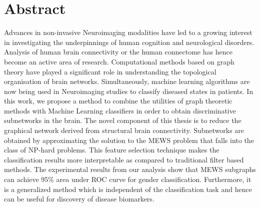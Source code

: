 \documentclass[msthesis.tex]{subfiles}
\begin{document}
\chapter{Abstract}
\thispagestyle{empty}

Advances in non-invasive Neuroimaging modalities have led to a growing interest in investigating the underpinnings of human cognition and neurological disorders. Analysis of human brain connectivity or the human connectome has hence become an active area of research. Computational methods based on graph theory have played a significant role in understanding the topological organisation of brain networks. Simultaneously, machine learning algorithms are now being used in Neuroimaging studies to classify diseased states in patients. In this work, we propose a method to combine the utilities of graph theoretic methods with Machine Learning classifiers in order to obtain discriminative subnetworks in the brain. The novel component of this thesis is to reduce the graphical network derived from structural brain connectivity. Subnetworks are obtained by approximating the solution to the \gls{MEWS} problem that falls into the class of NP-hard problems. This feature selection technique makes the classification results more interpretable as compared to traditional filter based methods. The experimental results from our analysis show that MEWS subgraphs can achieve 95\% area under \gls{ROC} curve for gender classification. Furthermore, it is a generalized method which is independent of the classification task and hence can be useful for discovery of disease biomarkers.
\end{document}
